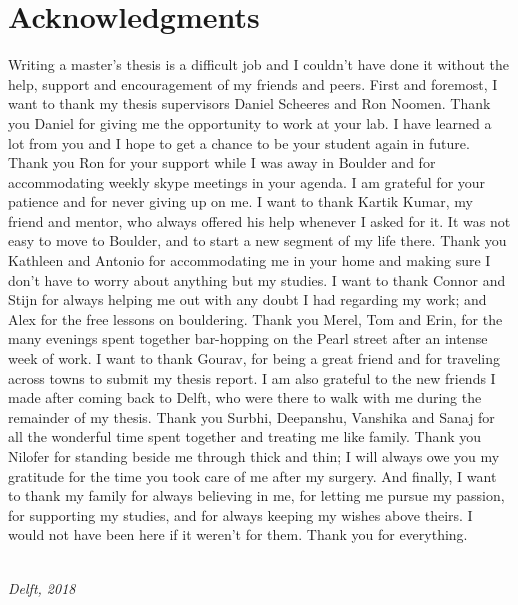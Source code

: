 \chapter*{Acknowledgments}

Writing a master's thesis is a difficult job and I couldn't have done it without the help, support and encouragement of my friends and peers. First and foremost, I want to thank my thesis supervisors Daniel Scheeres and Ron Noomen. Thank you Daniel for giving me the opportunity to work at your lab. I have learned a lot from you and I hope to get a chance to be your student again in future. Thank you Ron for your support while I was away in Boulder and for accommodating weekly skype meetings in your agenda. I am grateful for your patience and for never giving up on me. I want to thank Kartik Kumar, my friend and mentor, who always offered his help whenever I asked for it.
\newline\newline
It was not easy to move to Boulder, and to start a new segment of my life there. Thank you Kathleen and Antonio for accommodating me in your home and making sure I don't have to worry about anything but my studies. I want to thank Connor and Stijn for always helping me out with any doubt I had regarding my work; and Alex for the free lessons on bouldering. Thank you Merel, Tom and Erin, for the many evenings spent together bar-hopping on the Pearl street after an intense week of work.
\newline\newline
I want to thank Gourav, for being a great friend and for traveling across towns to submit my thesis report. I am also grateful to the new friends I made after coming back to Delft, who were there to walk with me during the remainder of my thesis. Thank you Surbhi, Deepanshu, Vanshika and Sanaj for all the wonderful time spent together and treating me like family. Thank you Nilofer for standing beside me through thick and thin; I will always owe you my gratitude for the time you took care of me after my surgery.
\newline\newline
And finally, I want to thank my family for always believing in me, for letting me pursue my passion, for supporting my studies, and for always keeping my wishes above theirs. I would not have been here if it weren't for them. Thank you for everything.

\begin{flushright}
{\makeatletter\itshape
    \@author \\
    Delft, 2018
\makeatother}
\end{flushright}
